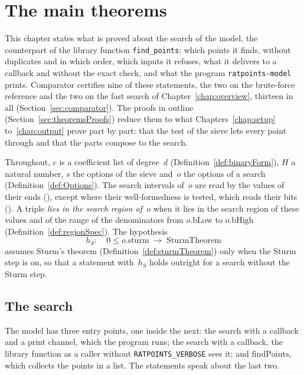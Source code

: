 \chapter{The main theorems}\label{chap:theorems}

This chapter states what is proved about the search of the model, the counterpart of the library
function \verb|find_points|: which points it finds, without duplicates and in which order, which
inputs it refuses, what it delivers to a callback and without the exact check, and what the program
\verb|ratpoints-model| prints. Comparator certifies nine of these statements, the two on the
brute-force reference and the two on the fast search of Chapter~\ref{chap:overview}, thirteen in all
(Section~\ref{sec:comparator}). The proofs in outline (Section~\ref{sec:theoremsProofs}) reduce them
to what Chapters~\ref{chap:setup} to~\ref{chap:output} prove part by part: that the test of the
sieve lets every point through and that the parts compose to the search.

Throughout, $c$ is a coefficient list of degree~$d$ (Definition~\ref{def:binaryForm}), $H$ a natural
number, $s$ the options of the sieve and~$o$ the options of a search (Definition~\ref{def:Options}).
The search intervals of~$o$ are read by the values of their ends (),
except where their well-formedness is tested, which reads their bits ().
A triple \emph{lies in the search region of~$o$} when it lies in the search region of these values
and of the range of the denominators from $o.\mathrm{bLow}$ to $o.\mathrm{bHigh}$
(Definition~\ref{def:regionSpec}). The hypothesis
\[ h_S\colon\quad 0 \le o.\mathrm{sturm} \;\to\; \mathrm{SturmTheorem} \]
assumes Sturm's theorem (Definition~\ref{def:sturmTheorem}) only when the Sturm step is on, so that
a statement with~$h_S$ holds outright for a search without the Sturm step.

\section{The search}\label{sec:theoremsSearch}

The model has three entry points, one inside the next: the search with a callback and a print
channel, which the program runs; the search with a callback, the library function as a caller
without \verb|RATPOINTS_VERBOSE| sees it; and $\mathrm{findPoints}$, which collects the points in a
list. The statements speak about the last two.

